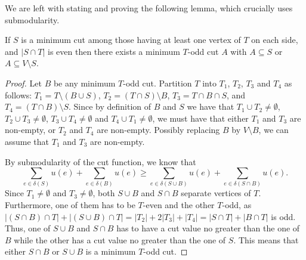 \documentclass[12pt]{article}
\begin{document}
We are left with stating and proving the following lemma, which crucially uses submodularity. 
\begin{lemma}
If $S$ is a minimum cut among those having at least one vertex of $T$
on each side, and $|S\cap T|$ is even then there exists a minimum
$T$-odd cut $A$ with $A\subseteq S$ or $A\subseteq V\setminus S$. 
\end{lemma}

\begin{proof}
Let $B$ be any minimum $T$-odd cut. Partition $T$ into $T_1$, $T_2$,
$T_3$ and $T_4$ as follows: $T_1=T\setminus (B \cup S)$, $T_2=(T\cap S)
\setminus B$, $T_3=T \cap B \cap S$, and $T_4=(T\cap B) \setminus S$. 
Since by definition of $B$ and $S$ we have that $T_1\cup T_2\neq
\emptyset$, $T_2\cup T_3\neq \emptyset$, $T_3\cup T_4\neq \emptyset$
and $T_4\cup T_1\neq \emptyset$, we must have that either $T_1$ and
$T_3$ are non-empty, or $T_2$ and $T_4$ are non-empty. Possibly
replacing $B$ by $V\setminus B$, we can assume that $T_1$ and $T_3$
are non-empty. 

By submodularity of the cut function, we know that 
\begin{equation}\label{cutsubm}
\sum_{e\in \delta(S)} u(e) + \sum_{e\in \delta(B)} u(e) \geq  \sum_{e\in
  \delta(S\cup B)} u(e) + \sum_{e\in \delta(S\cap B)} u(e).
\end{equation} Since
$T_1\neq \emptyset$ and $T_3\neq \emptyset$, both $S\cup B$ and $S\cap
B$ separate vertices of $T$. Furthermore, one of them has to be
$T$-even and the other $T$-odd, as $|(S\cap B)\cap T| + |(S\cup B)
\cap T| = |T_2| + 2 |T_3| + |T_4|=|S\cap T| + |B\cap T|$ is odd. Thus,
one of $S\cup B$ and $S\cap B$ has to have a cut value no greater than
the one of $B$ while the other has a cut value no greater than the one
of $S$. This means that either $S\cap B$ or $S \cup B$ is a minimum
$T$-odd cut. 
\end{proof} 
    
\end{document}
